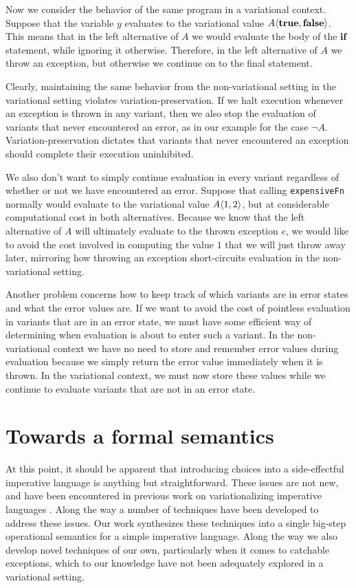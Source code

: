 \documentclass[12pt,oneside]{book}
\begin{document}
Now we consider the behavior of the same program in a variational context.
Suppose that the variable $y$ evaluates to the variational value
$A \langle \textbf{\textup{\textrm{true}}}, \textbf{\textup{\textrm{false}}} \rangle$. This means that in the left alternative of $A$ we
would evaluate the body of the $\textbf{\textup{\textrm{if}}}$ statement, while ignoring it otherwise. Therefore,
in the left alternative of $A$ we throw an exception, but otherwise we continue on to the
final statement.

Clearly, maintaining the same behavior from the non-variational setting in the variational setting
violates variation-preservation. If we halt execution whenever an exception is
thrown in any variant, then we also stop the evaluation of variants that never encountered an error,
as in our example for the case $\neg A$. Variation-preservation dictates that variants that never encountered
an exception should complete their execution uninhibited.

We also don't want to simply continue evaluation
in every variant regardless of whether or not we have encountered an error.
Suppose that calling \texttt{expensiveFn} normally would evaluate to the variational value $A \langle 1, 2 \rangle$, but at considerable computational cost in both alternatives.
Because we know that the left alternative of $A$ will ultimately evaluate to the thrown exception $e$, we would
like to avoid the cost involved in computing the value $1$ that we will just throw away later, mirroring how throwing an exception short-circuits evaluation in the
non-variational setting. 

Another problem concerns how to keep track of which variants are in error states and what
the error values are. If we want to avoid the cost of pointless evaluation in variants that are in an error
state, we must have some efficient way of determining when evaluation is about to enter such a variant.
In the non-variational context we have no need to store and remember error values during evaluation
because we simply return the error value immediately when it is thrown. In the variational context, we
must now store these values while we continue to evaluate variants that are not in an error state.

\section{Towards a formal semantics}

At this point, it should be apparent that introducing choices into a side-effectful imperative language
is anything but straightforward. These issues are not new, and have been encountered in previous
work on variationalizing imperative languages \cite{varwhile,varex,varexj}. Along the way a number of
techniques have been developed to address these issues. Our work synthesizes these techniques into
a single big-step operational semantics for a simple imperative language. Along the way we also develop
novel techniques of our own, particularly when it comes to catchable exceptions, which to our knowledge
have not been adequately explored in a variational setting.
\end{document}

